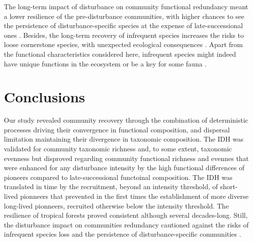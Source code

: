 \documentclass[fleqn,10pt]{ArtEcoFoG} %
\begin{document}
The long-term impact of disturbance on community functional redundancy
meant a lower resilience of the pre-disturbance communities, with higher
chances to see the persistence of disturbance-specific species at the
expense of late-successional ones \citep{Haddad2008}. Besides, the
long-term recovery of infrequent species increases the risks to loose
cornerstone species, with unexpected ecological consequences
\citep{Jones1994, Chazdon2003a, Diaz2005}. Apart from the functional
characteristics considered here, infrequent species might indeed have
unique functions in the ecosystem or be a key for some fauna
\citep{Schleuning2016}.

\section{Conclusions}\label{conclusions}

Our study revealed community recovery through the combination of
deterministic processes driving their convergence in functional
composition, and dispersal limitation maintaining their divergence in
taxonomic composition. The IDH was validated for community taxonomic
richness and, to some extent, taxonomic evenness but disproved regarding
community functional richness and evennes that were enhanced for any
disturbance intensity by the high functional differences of pioneers
compared to late-successional functoinal composition. The IDH was
translated in time by the recruitment, beyond an intensity threshold, of
short-lived pionneers that prevented in the first times the
establishment of more diverse long-lived pionneers, recruited otherwise
below the intensity threshold. The resilience of tropical forests proved
consistent although several decades-long. Still, the disturbance impact
on communities redundancy cautioned against the risks of infrequent
species loss and the persistence of disturbance-specific communities
\citep{Gourlet-Fleury2005}.



\makeatletter

\makeatother


\end{document}
